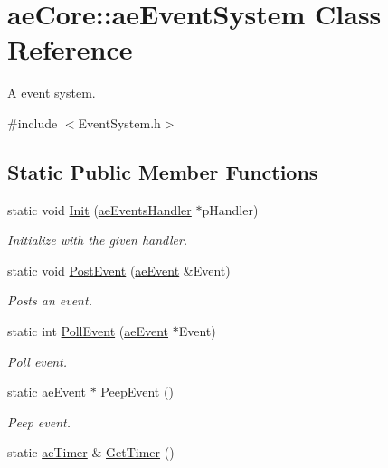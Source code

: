 \hypertarget{classae_core_1_1ae_event_system}{}\section{ae\+Core\+:\+:ae\+Event\+System Class Reference}
\label{classae_core_1_1ae_event_system}


A event system.  




{\ttfamily \#include $<$Event\+System.\+h$>$}

\subsection*{Static Public Member Functions}
\begin{DoxyCompactItemize}
\item 
static void \hyperlink{classae_core_1_1ae_event_system_ad1c23fc489280b2545f831875d13855c}{Init} (\hyperlink{structae_core_1_1ae_events_handler}{ae\+Events\+Handler} $\ast$p\+Handler)
\begin{DoxyCompactList}\small\item\em Initialize with the given handler. \end{DoxyCompactList}\item 
static void \hyperlink{classae_core_1_1ae_event_system_a0550d20c311d01832b9c048dbd83245d}{Post\+Event} (\hyperlink{structae_core_1_1ae_event}{ae\+Event} \&Event)
\begin{DoxyCompactList}\small\item\em Posts an event. \end{DoxyCompactList}\item 
static int \hyperlink{classae_core_1_1ae_event_system_abde1be2ec7ef77a05256e5f50092047c}{Poll\+Event} (\hyperlink{structae_core_1_1ae_event}{ae\+Event} $\ast$Event)
\begin{DoxyCompactList}\small\item\em Poll event. \end{DoxyCompactList}\item 
static \hyperlink{structae_core_1_1ae_event}{ae\+Event} $\ast$ \hyperlink{classae_core_1_1ae_event_system_a6d180c51301f1f5e7a66958696c1fb5d}{Peep\+Event} ()
\begin{DoxyCompactList}\small\item\em Peep event. \end{DoxyCompactList}\item 
static \hyperlink{classae_core_1_1ae_timer}{ae\+Timer} \& \hyperlink{classae_core_1_1ae_event_system_aec274a337e502a3216e294f93d512bfb}{Get\+Timer} ()

\end{DoxyCompactItemize}
